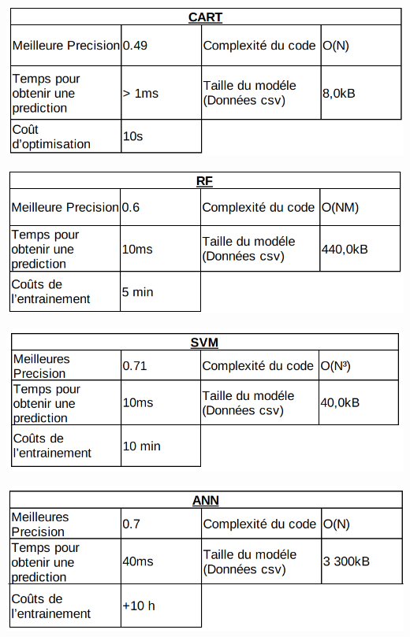 \documentclass[10pt]{article}
\begin{document}
\begin{minipage}[t]{0.5\linewidth}

\includegraphics[width=\textwidth]{DecisionTree-FinalCompar.png}

\end{minipage}
\begin{minipage}[t]{0.5\linewidth}

\includegraphics[width=\textwidth]{RF-FinalCompar.png}

\end{minipage}
\newline
\newline
\newline
\begin{minipage}[t]{0.5\linewidth}

\includegraphics[width=\textwidth]{SVM-FinalCompar.png}

\end{minipage}
\begin{minipage}[t]{0.5\linewidth}

\includegraphics[width=\textwidth]{ANN-FinalCompar.png}

\end{minipage}
\end{document}
